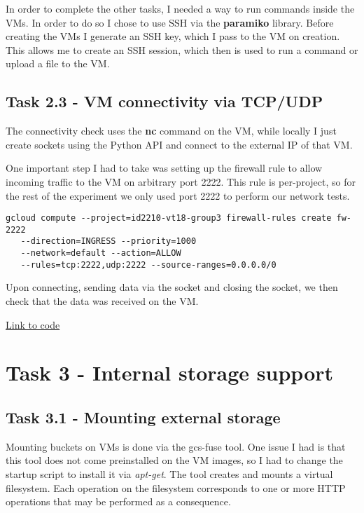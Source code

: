 \documentclass[paper=a4, fontsize=11pt]{scrartcl}
\numberwithin{equation}{section}    %
\numberwithin{figure}{section}      %
\numberwithin{table}{section}       %
\begin{document}
In order to complete the other tasks, I needed a way to run commands inside the VMs. In order to do so I chose to use SSH via the \textbf{paramiko} library. Before creating the VMs I generate an SSH key, which I pass to the VM on creation.
This allows me to create an SSH session, which then is used to run a command or upload a file to the VM.

\subsection{Task 2.3 - VM connectivity via TCP/UDP}

The connectivity check uses the \textbf{nc} command on the VM, while locally I just create sockets using the Python API and connect to the external IP of that VM.

One important step I had to take was setting up the firewall rule to allow incoming traffic to the VM on arbitrary port 2222. This rule is per-project, so for the rest of the experiment we only used port 2222 to perform our network tests.

\begin{verbatim}
gcloud compute --project=id2210-vt18-group3 firewall-rules create fw-2222
   --direction=INGRESS --priority=1000
   --network=default --action=ALLOW
   --rules=tcp:2222,udp:2222 --source-ranges=0.0.0.0/0
\end{verbatim}

Upon connecting, sending data via the socket and closing the socket, we then check that the data was received on the VM. 

\href{https://github.com/valenting/id2210-cloud-project-2018/blob/master/test_compute.py}{Link to code}

\section{Task 3 - Internal storage support}

\subsection{Task 3.1 - Mounting external storage}

Mounting buckets on VMs is done via the gcs-fuse tool. One issue I had is that this tool does not come preinstalled on the VM images, so I had to change the startup script to install it via \textit{apt-get}.
The tool creates and mounts a virtual filesystem. Each operation on the filesystem corresponds to one or more HTTP operations that may be performed as a consequence.
\end{document}
